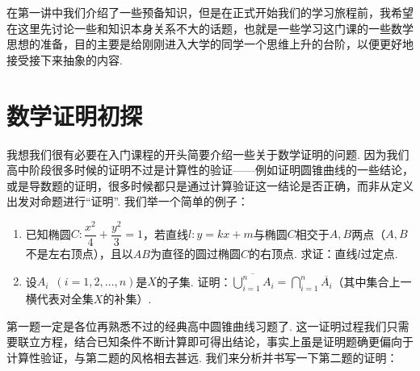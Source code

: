 \newcommand{\suc}{\operatorname{suc}}

在第一讲中我们介绍了一些预备知识，但是在正式开始我们的学习旅程前，我希望在这里先讨论一些和知识本身关系不大的话题，也就是一些学习这门课的一些数学思想的准备，目的主要是给刚刚进入大学的同学一个思维上升的台阶，以便更好地接受接下来抽象的内容.

\section{数学证明初探}

我想我们很有必要在入门课程的开头简要介绍一些关于数学证明的问题. 因为我们高中阶段很多时候的证明不过是计算性的验证——例如证明圆锥曲线的一些结论，或是导数题的证明，很多时候都只是通过计算验证这一结论是否正确，而非从定义出发对命题进行``证明''. 我们举一个简单的例子：

\begin{example}
    \begin{enumerate}
        \item 已知椭圆$C:\dfrac{x^2}{4}+\dfrac{y^2}{3}=1$，若直线$l:y=kx+m$与椭圆$C$相交于$A,B$两点（$A,B$不是左右顶点），且以$AB$为直径的圆过椭圆$C$的右顶点. 求证：直线$l$过定点.

        \item 设$A_i\enspace(i=1,2,\ldots,n)$是$X$的子集. 证明：$\overline{\displaystyle\bigcup_{i=1}^nA_i}=\displaystyle\bigcap_{i=1}^n\overline{A_i}$（其中集合上一横代表对全集$X$的补集）.
    \end{enumerate}
\end{example}

第一题一定是各位再熟悉不过的经典高中圆锥曲线习题了. 这一证明过程我们只需要联立方程，结合已知条件不断计算即可得出结论，事实上虽是证明题确更偏向于计算性验证，与第二题的风格相去甚远. 我们来分析并书写一下第二题的证明：

